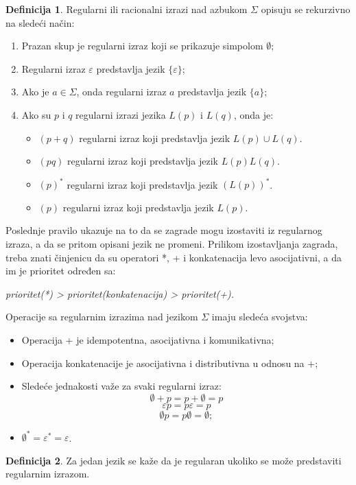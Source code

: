 \documentclass[12pt,oneside]{memoir}
\theoremstyle{plain}
\theoremstyle{definition}
\newtheorem{defn}{Definicija} %
\begin{document}
\begin{defn}
Regularni ili racionalni izrazi nad azbukom $\Sigma$ opisuju se rekurzivno na sledeći način:
\begin{enumerate}
\item Prazan skup je regularni izraz koji se prikazuje simpolom $\emptyset$;
\item Regularni izraz $\varepsilon$ predstavlja jezik $\{\varepsilon\}$;
\item Ako je $a \in \Sigma$, onda regularni izraz $a$ predstavlja jezik $\{a\}$;
\item Ako su $p$ i $q$ regularni izrazi jezika $L(p)$ i $L(q)$, onda je:
	\begin{itemize}
	\item $(p+q)$ regularni izraz koji predstavlja jezik $L(p) \cup L(q)$.
	\item $(pq)$ regularni izraz koji predstavlja jezik $L(p)L(q)$.
	\item $(p)^*$ regularni izraz koji predstavlja jezik $(L(p))^*$.
	\item $(p)$ regularni izraz koji predstavlja jezik $L(p)$.
	\end{itemize}
\end{enumerate}
\end{defn}

Poslednje pravilo ukazuje na to da se zagrade mogu izostaviti iz regularnog izraza, a da se pritom opisani jezik ne promeni. Prilikom izostavljanja zagrada, treba znati činjenicu da su operatori *, + i konkatenacija levo asocijativni, a da im je prioritet određen sa:
\begin{center}
\textit{prioritet(*) > prioritet(konkatenacija) > prioritet(+).}
\end{center}

Operacije sa regularnim izrazima nad jezikom $\Sigma$ imaju sledeća svojstva:
\begin{itemize}
\item Operacija + je idempotentna, asocijativna i komunikativna;
\item Operacija konkatenacije je asocijativna i distributivna u odnosu na +;
\item Sledeće jednakosti važe za svaki regularni izraz:
$$\emptyset + p = p + \emptyset = p$$
$$\varepsilon p = p\varepsilon = p$$
$$\emptyset p = p\emptyset = \emptyset ;$$
\item $\emptyset^* = \varepsilon^* = \varepsilon$.
\end{itemize}

\begin{defn}
Za jedan jezik se kaže da je regularan ukoliko se može predstaviti regularnim izrazom. 
\end{defn}
\end{document}
